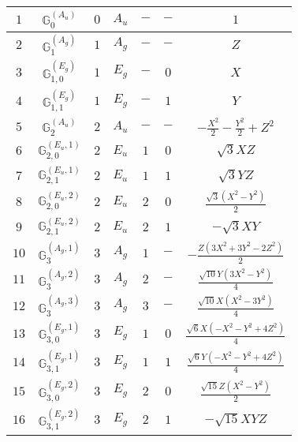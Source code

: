 \documentclass[fleqn,10pt,landscape]{article}
\begin{document}
\begin{itemize}
\begin{center}
\begin{longtable}{ccccccc}
$ 1 $ & $ \mathbb{G}_{0}^{(A_{u})} $ & $ 0 $ & $ A_{u} $ & $ - $ & $ - $ & $ 1 $ \\ \hline
$ 2 $ & $ \mathbb{G}_{1}^{(A_{g})} $ & $ 1 $ & $ A_{g} $ & $ - $ & $ - $ & $ Z $ \\
$ 3 $ & $ \mathbb{G}_{1,0}^{(E_{g})} $ & $ 1 $ & $ E_{g} $ & $ - $ & $ 0 $ & $ X $ \\
$ 4 $ & $ \mathbb{G}_{1,1}^{(E_{g})} $ & $ 1 $ & $ E_{g} $ & $ - $ & $ 1 $ & $ Y $ \\ \hline
$ 5 $ & $ \mathbb{G}_{2}^{(A_{u})} $ & $ 2 $ & $ A_{u} $ & $ - $ & $ - $ & $ - \frac{X^{2}}{2} - \frac{Y^{2}}{2} + Z^{2} $ \\
$ 6 $ & $ \mathbb{G}_{2,0}^{(E_{u},1)} $ & $ 2 $ & $ E_{u} $ & $ 1 $ & $ 0 $ & $ \sqrt{3} X Z $ \\
$ 7 $ & $ \mathbb{G}_{2,1}^{(E_{u},1)} $ & $ 2 $ & $ E_{u} $ & $ 1 $ & $ 1 $ & $ \sqrt{3} Y Z $ \\
$ 8 $ & $ \mathbb{G}_{2,0}^{(E_{u},2)} $ & $ 2 $ & $ E_{u} $ & $ 2 $ & $ 0 $ & $ \frac{\sqrt{3} \left(X^{2} - Y^{2}\right)}{2} $ \\
$ 9 $ & $ \mathbb{G}_{2,1}^{(E_{u},2)} $ & $ 2 $ & $ E_{u} $ & $ 2 $ & $ 1 $ & $ - \sqrt{3} X Y $ \\ \hline
$ 10 $ & $ \mathbb{G}_{3}^{(A_{g},1)} $ & $ 3 $ & $ A_{g} $ & $ 1 $ & $ - $ & $ - \frac{Z \left(3 X^{2} + 3 Y^{2} - 2 Z^{2}\right)}{2} $ \\
$ 11 $ & $ \mathbb{G}_{3}^{(A_{g},2)} $ & $ 3 $ & $ A_{g} $ & $ 2 $ & $ - $ & $ \frac{\sqrt{10} Y \left(3 X^{2} - Y^{2}\right)}{4} $ \\
$ 12 $ & $ \mathbb{G}_{3}^{(A_{g},3)} $ & $ 3 $ & $ A_{g} $ & $ 3 $ & $ - $ & $ \frac{\sqrt{10} X \left(X^{2} - 3 Y^{2}\right)}{4} $ \\
$ 13 $ & $ \mathbb{G}_{3,0}^{(E_{g},1)} $ & $ 3 $ & $ E_{g} $ & $ 1 $ & $ 0 $ & $ \frac{\sqrt{6} X \left(- X^{2} - Y^{2} + 4 Z^{2}\right)}{4} $ \\
$ 14 $ & $ \mathbb{G}_{3,1}^{(E_{g},1)} $ & $ 3 $ & $ E_{g} $ & $ 1 $ & $ 1 $ & $ \frac{\sqrt{6} Y \left(- X^{2} - Y^{2} + 4 Z^{2}\right)}{4} $ \\
$ 15 $ & $ \mathbb{G}_{3,0}^{(E_{g},2)} $ & $ 3 $ & $ E_{g} $ & $ 2 $ & $ 0 $ & $ \frac{\sqrt{15} Z \left(X^{2} - Y^{2}\right)}{2} $ \\
$ 16 $ & $ \mathbb{G}_{3,1}^{(E_{g},2)} $ & $ 3 $ & $ E_{g} $ & $ 2 $ & $ 1 $ & $ - \sqrt{15} X Y Z $ \\
\end{longtable}
\end{center}


\end{itemize}
\end{document}
